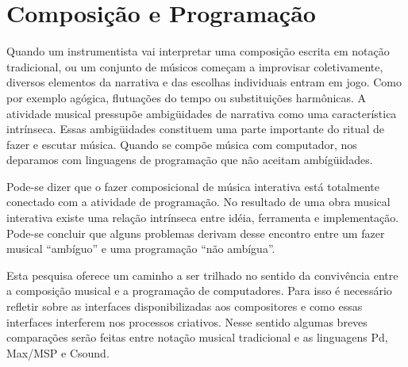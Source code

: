 \documentclass{ppgmus}
\begin{document}
\section{Composição e Programação}
  



Quando um instrumentista
vai interpretar uma composição escrita em notação tradicional, ou um conjunto de 
músicos começam a improvisar coletivamente, diversos elementos da narrativa e 
das escolhas individuais entram em jogo. Como por exemplo agógica, flutuações do tempo ou
 substituições harmônicas. A atividade musical pressupõe ambigüidades de narrativa como
uma característica intrínseca.
Essas ambigüidades constituem uma parte importante do ritual de fazer
e escutar música. Quando se compõe música com computador, nos
deparamos com linguagens de programação que não aceitam ambígüidades.

Pode-se dizer que o fazer composicional de música interativa está 
totalmente conectado com a atividade de programação. No resultado de uma
obra musical interativa existe uma relação intrínseca entre idéia, ferramenta e 
implementação. Pode-se concluir que alguns 
problemas derivam desse encontro entre um fazer musical ``ambíguo'' e uma programação
``não ambígua''. 


Esta pesquisa oferece um caminho a ser trilhado no sentido da convivência
entre a composição musical e a programação de computadores.
Para isso é necessário refletir sobre as interfaces disponibilizadas
aos compositores e como essas interfaces interferem nos processos criativos.
Nesse sentido algumas breves comparações serão feitas entre notação musical
tradicional e as linguagens Pd, Max/MSP e Csound.
\end{document}
